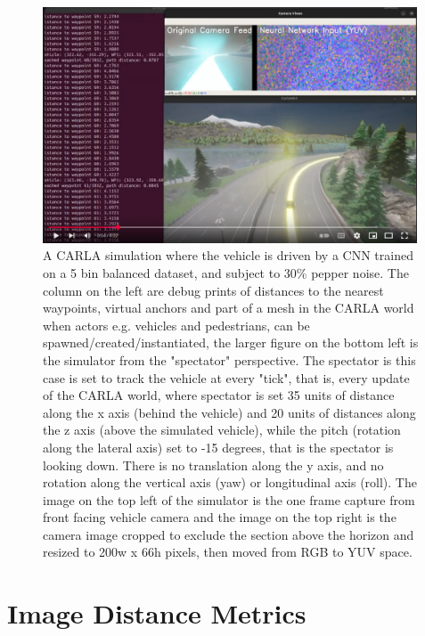 \begin{figure}[h!]
\centering
\includegraphics[width=0.99\textwidth]{Figures/Results/youtubeidCzJlbYX0CnQ_experiment239_30pc_pepper_noise_5bin_cnn_balanced.png}
\caption{A CARLA simulation where the vehicle is driven by a CNN trained on a 5 bin balanced dataset, and subject to 30\% pepper noise. The column on the left are debug prints of distances to the nearest waypoints, virtual anchors and part of a mesh in the CARLA world when actors e.g. vehicles and pedestrians, can be spawned/created/instantiated, the larger figure on the bottom left is the simulator from the "spectator" perspective. The spectator is this case is set to track the vehicle at every "tick", that is, every update of the CARLA world, where spectator is set 35 units of distance along the x axis (behind the vehicle) and 20 units of distances along the z axis (above the simulated vehicle), while the pitch (rotation along the lateral axis) set to -15 degrees, that is the spectator is looking down. There is no translation along the y axis, and no rotation along the vertical axis (yaw) or longitudinal axis (roll). The image on the top left of the simulator is the one frame capture from front facing vehicle camera and the image on the top right is the camera image cropped to exclude the section above the horizon and resized to 200w x 66h pixels, then moved from RGB to YUV space.}
\label{fig:youtubeidCzJlbYX0CnQ_experiment239_30pc_pepper_noise_5bin_cnn_balanced}
\end{figure}



\section{Image Distance Metrics}
\label{methods:distance_metrics}

